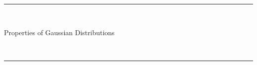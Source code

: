 \documentclass[a4paper]{article}
\theoremstyle{definition}
\begin{document}
\fancyhead[C]{}
\hrule \medskip
\begin{minipage}{0.295\textwidth}
    \raggedright
    \hfill\\
\end{minipage}
\begin{minipage}{0.4\textwidth}
    \centering
    \large
    Properties of Gaussian Distributions\\
\end{minipage}
\begin{minipage}{0.295\textwidth}
    \raggedleft
    \hfill\\
\end{minipage}
\medskip\hrule
\bigskip
 
\end{document}
